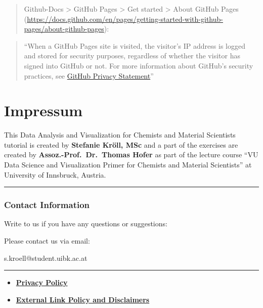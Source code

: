 \documentclass[
  letterpaper,
  DIV=11,
  numbers=noendperiod]{scrreprt}
\providecommand{\tightlist}{%
  \setlength{\itemsep}{0pt}\setlength{\parskip}{0pt}}\usepackage{longtable,booktabs,array}
\begin{document}
\begin{quote}
Github-Docs \textgreater{} GitHub Pages \textgreater{} Get started
\textgreater{} About GitHub Pages
(\url{https://docs.github.com/en/pages/getting-started-with-github-pages/about-github-pages}):
\end{quote}

\begin{quote}
``When a GitHub Pages site is visited, the visitor's IP address is
logged and stored for security purposes, regardless of whether the
visitor has signed into GitHub or not. For more information about
GitHub's security practices, see
\href{https://docs.github.com/en/site-policy/privacy-policies/github-general-privacy-statemen}{GitHub
Privacy Statement}''
\end{quote}

\chapter{Impressum}\label{impressum}

This Data Analysis and Visualization for Chemists and Material
Scientists tutorial is created by \textbf{Stefanie Kröll, MSc} and a
part of the exercises are created by \textbf{Assoz.-Prof.~Dr.~Thomas
Hofer} as part of the lecture course ``VU Data Science and Visualization
Primer for Chemists and Material Scientists'' at University of
Innsbruck, Austria.

\begin{center}\rule{0.5\linewidth}{0.5pt}\end{center}

\subsection{Contact Information}\label{contact-information}

Write to us if you have any questions or suggestions:

Please contact us via email:

s.kroell@student.uibk.ac.at

\begin{center}\rule{0.5\linewidth}{0.5pt}\end{center}

\begin{itemize}
\tightlist
\item
  \textbf{\href{privacy.qmd}{Privacy Policy}}
\item
  \textbf{\href{disclaimer.qmd}{External Link Policy and Disclaimers}}
\end{itemize}
\end{document}
